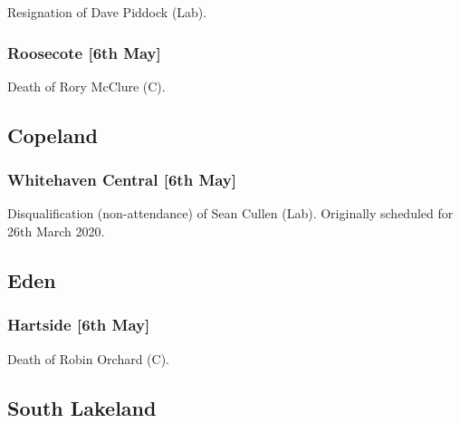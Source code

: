 \documentclass[a4paper,openany]{book}
\begin{document}
\begin{resultsiii}

Resignation of Dave Piddock (Lab).

\subsubsection*{Roosecote \hspace*{\fill}\nolinebreak[1]%
	\enspace\hspace*{\fill}
	[6th May]}


Death of Rory McClure (C).

\subsection*{Copeland}

\subsubsection*{Whitehaven Central \hspace*{\fill}\nolinebreak[1]%
	\enspace\hspace*{\fill}
	[6th May]}


Disqualification (non-attendance) of Sean Cullen (Lab).  Originally scheduled for 26th March 2020.

\subsection*{Eden}

\subsubsection*{Hartside \hspace*{\fill}\nolinebreak[1]%
	\enspace\hspace*{\fill}
	[6th May]}


Death of Robin Orchard (C).

\subsection*{South Lakeland}


\end{resultsiii}
\end{document}
